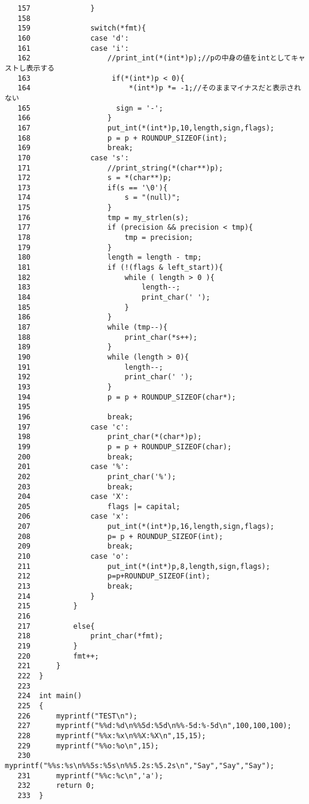\documentclass[a4j,11pt]{jarticle}
\begin{document}
\begin{verbatim}
   157	            }
   158	
   159	            switch(*fmt){
   160	            case 'd':
   161	            case 'i':
   162	                //print_int(*(int*)p);//pの中身の値をintとしてキャストし表示する
   163	                 if(*(int*)p < 0){
   164	                     *(int*)p *= -1;//そのままマイナスだと表示されない
   165	                  sign = '-';
   166	                }
   167	                put_int(*(int*)p,10,length,sign,flags);
   168	                p = p + ROUNDUP_SIZEOF(int);
   169	                break;
   170	            case 's':
   171	                //print_string(*(char**)p);
   172	                s = *(char**)p;
   173	                if(s == '\0'){
   174	                    s = "(null)";
   175	                }
   176	                tmp = my_strlen(s);
   177	                if (precision && precision < tmp){
   178	                    tmp = precision;
   179	                }
   180	                length = length - tmp;
   181	                if (!(flags & left_start)){   
   182	                    while ( length > 0 ){
   183	                        length--;
   184	                        print_char(' ');
   185	                    } 
   186	                }
   187	                while (tmp--){
   188	                    print_char(*s++);
   189	                }
   190	                while (length > 0){
   191	                    length--;
   192	                    print_char(' ');
   193	                }
   194	                p = p + ROUNDUP_SIZEOF(char*);
   195	
   196	                break;
   197	            case 'c':
   198	                print_char(*(char*)p);
   199	                p = p + ROUNDUP_SIZEOF(char);
   200	                break;
   201	            case '%':
   202	                print_char('%');
   203	                break;
   204	            case 'X':
   205	                flags |= capital;
   206	            case 'x':
   207	                put_int(*(int*)p,16,length,sign,flags);
   208	                p= p + ROUNDUP_SIZEOF(int);
   209	                break;
   210	            case 'o':
   211	                put_int(*(int*)p,8,length,sign,flags);
   212	                p=p+ROUNDUP_SIZEOF(int);
   213	                break;
   214	            }
   215	        }
   216	
   217	        else{
   218	            print_char(*fmt);
   219	        }
   220	        fmt++;
   221	    }
   222	}
   223	
   224	int main()
   225	{
   226	    myprintf("TEST\n");
   227	    myprintf("%%d:%d\n%%5d:%5d\n%%-5d:%-5d\n",100,100,100);
   228	    myprintf("%%x:%x\n%%X:%X\n",15,15);
   229	    myprintf("%%o:%o\n",15);
   230	    myprintf("%%s:%s\n%%5s:%5s\n%%5.2s:%5.2s\n","Say","Say","Say");
   231	    myprintf("%%c:%c\n",'a');
   232	    return 0;
   233	}
\end{verbatim}
\end{document}
